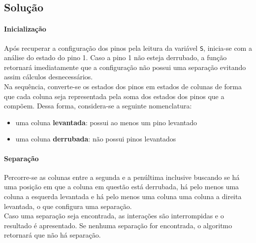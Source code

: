\documentclass[a4paper]{article}
\begin{document}
\subsection{Solução}

\paragraph{Inicialização} Após recuperar a configuração dos pinos pela leitura da variável \texttt{S}, inicia-se com a análise do estado do pino 1. Caso a pino 1 não esteja derrubado, a função retornará imediatamente que a configuração não possui uma separação evitando assim cálculos desnecessários.\\

\noindent Na sequência, converte-se os estados dos pinos em estados de colunas de forma que cada coluna seja representada pela soma dos estados dos pinos que a compõem. Dessa forma, considera-se a seguinte nomenclatura:
\begin{itemize}
    \item uma coluna \textbf{levantada}: possui ao menos um pino levantado
    \item uma coluna \textbf{derrubada}: não possui pinos levantados
\end{itemize}

\paragraph{Separação} Percorre-se as colunas entre a segunda e a penúltima inclusive buscando se há uma posição em que a coluna em questão está derrubada, há pelo menos uma coluna a esquerda levantada e há pelo menos uma coluna uma coluna a direita levantada, o que configura uma separação.\\

\noindent Caso uma separação seja encontrada, as interações são interrompidas e o resultado é apresentado. Se nenhuma separação for encontrada, o algoritmo retornará que não há separação.
\end{document}
